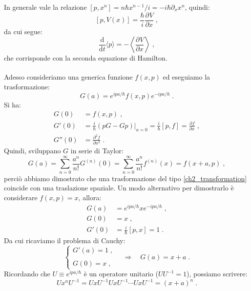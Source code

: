 \documentclass[12pt,a4paper]{report}
\theoremstyle{definition}
\newcommand{\pdev}[3][]{\frac{\partial^{#1} #2}{\partial #3^{#1}}}
\numberwithin{equation}{section}
\newcommand{\diff}[1][]{\mathrm{d}#1}
\newcommand{\bra}{\langle}
\newcommand{\ket}{\rangle}
\begin{document}
In generale vale la relazione $[p,x^n]=n\hbar x^{n-1}/i=-i\hbar\partial_x x^n$, quindi:
$$
[p,V(x)]=\frac{\hbar}{i}\pdev{V}{x}\;,
$$
da cui segue:
\begin{equation}
\frac{\mathrm{d}}{\diff{t}}\bra p\ket=-\left\langle\pdev{V}{x}\right\rangle\;,
\end{equation}
che corrisponde con la seconda equazione di Hamilton. \\
\\
Adesso consideriamo una generica funzione $f(x,p)$ ed eseguiamo la trasformazione:
\begin{equation}
G(a)=e^{ipa/\hbar}f(x,p)e^{-ipa/\hbar}\;. \label{ch2_transformation}
\end{equation}
Si ha:
\begin{align*}
G(0) &=f(x,p)\;, \\
G'(0) &= \frac{i}{\hbar}\left.(pG-Gp)\right|_{a=0}=\frac{i}{\hbar}[p,f]=\pdev{f}{x}\;, \\
G''(0) &= \pdev[2]{f}{x}\;.
\end{align*}
Quindi, sviluppano $G$ in serie di Taylor:
$$
G(a)=\sum_{n=0}^{\infty}\frac{a^n}{n!}G^{(n)}(0)=\sum_{n=0}^{\infty} \frac{a^n}{n!}f^{(n)}(x)=f(x+a,p)\;,
$$
perciò abbiamo dimostrato che una trasformazione del tipo \eqref{ch2_transformation} coincide con una traslazione spaziale. Un modo alternativo per dimostrarlo è considerare $f(x,p)=x$, allora:
\begin{align*}
G(a) &= e^{ipa/\hbar}xe^{-ipa/\hbar}\;, \\
G(0) &= x\;, \\
G'(0)&=\frac{i}{\hbar}[p,x]=1\;.
\end{align*}
Da cui ricaviamo il problema di Cauchy:
\begin{equation}
\begin{cases}
G'(a)=1\;, \\
\\
G(0)=x\;,
\end{cases}\quad \Longrightarrow\quad G(a)=x+a\;.
\end{equation}
Ricordando che $U\equiv e^{ipa/\hbar}$ è un operatore unitario ($UU^{-1}=1$), possiamo scrivere:
$$
Ux^nU^{-1}=UxU^{-1}UxU^{-1}\cdots UxU^{-1}=(x+a)^n\;.
$$
\end{document}
